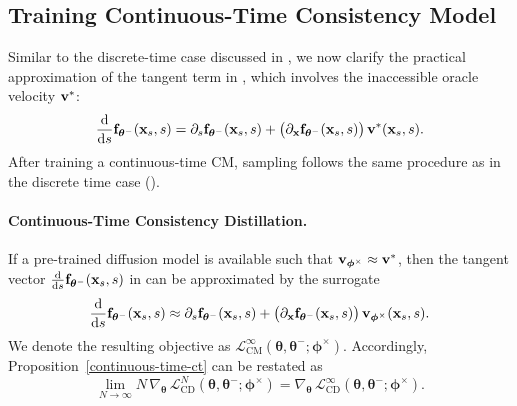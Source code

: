 \subsection{Training Continuous-Time Consistency Model}
Similar to the discrete-time case discussed in , 
we now clarify the practical approximation of the tangent term in 
, which involves the inaccessible oracle velocity ${\mathbf{v}}^*$:
\begin{align*}
    \frac{\mathop{}\!\mathrm{d}}{\mathop{}\!\mathrm{d} s}{\mathbf{f}}_{{\bm{\theta}}^-}({\mathbf{x}}_s,s)
    = \partial_s {\mathbf{f}}_{{\bm{\theta}}^-}({\mathbf{x}}_s,s)
    + \big(\partial_{{\mathbf{x}}}{\mathbf{f}}_{{\bm{\theta}}^-}({\mathbf{x}}_s,s)\big)\,{\mathbf{v}}^*({\mathbf{x}}_s,s).
\end{align*}
After training a continuous-time CM, sampling follows the same procedure as in
the discrete time case ().

\paragraph{Continuous-Time Consistency Distillation.}
If a pre-trained diffusion model is available such that
${\mathbf{v}}_{\bm{\phi}^\times} \approx {\mathbf{v}}^*$, then the tangent vector
$\tfrac{\mathop{}\!\mathrm{d}}{\mathop{}\!\mathrm{d} s}{\mathbf{f}}_{{\bm{\theta}}^-}({\mathbf{x}}_s,s)$ in
 can be approximated by the surrogate
\begin{align}\label{eq:cd-continuous-time}
    \frac{\mathop{}\!\mathrm{d}}{\mathop{}\!\mathrm{d} s}{\mathbf{f}}_{{\bm{\theta}}^-}({\mathbf{x}}_s,s) 
     \approx 
    \partial_s {\mathbf{f}}_{{\bm{\theta}}^-}({\mathbf{x}}_s,s)
    + \big(\partial_{{\mathbf{x}}}{\mathbf{f}}_{{\bm{\theta}}^-}({\mathbf{x}}_s,s)\big)\,
      {\mathbf{v}}_{\bm{\phi}^\times}({\mathbf{x}}_s,s).
\end{align}
We denote the resulting objective as
$\mathcal{L}^\infty_{\mathrm{CM}}(\bm{\theta},\bm{\theta}^-;\bm{\phi}^\times)$.
Accordingly, Proposition~\ref{continuous-time-ct} can be restated as
\[
\lim_{N\to\infty} 
N \,\nabla_{\bm{\theta}}\,
\mathcal{L}_{\mathrm{CD}}^{N}(\bm{\theta},\bm{\theta}^-;\bm{\phi}^\times)
  = 
\nabla_{\bm{\theta}}\,
\mathcal{L}_{\mathrm{CD}}^{\infty}(\bm{\theta},\bm{\theta}^-;\bm{\phi}^\times).
\]


